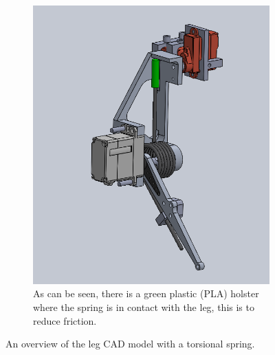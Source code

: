 \begin{figure}[h!]
\begin{subfigure}[b]{0.45\textwidth}
        \includegraphics[width=\textwidth]{Images/CAD_leg_outside_bent.png}
        \caption{As can be seen, there is a green plastic (PLA) holster where the spring is in contact with the leg, this is to reduce  friction.}
        \label{fig:image2}
    \end{subfigure}
    \caption{An overview of the leg CAD model with a torsional spring. }
    \label{fig:assembly_CAD}
\end{figure}

